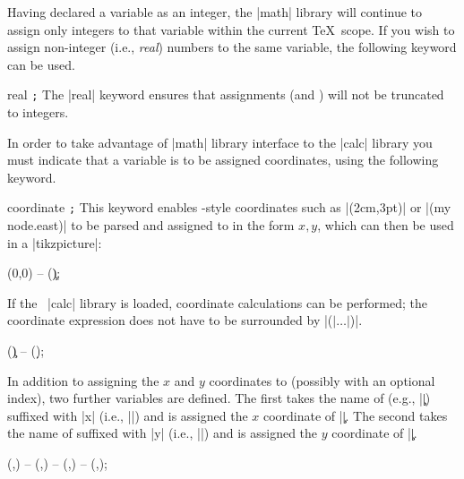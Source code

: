Having declared a variable as an integer, the |math| library will continue to
assign only integers to that variable within the current \TeX\ scope. If you
wish to assign non-integer (i.e., \emph{real}) numbers to the same variable,
the following keyword can be used.

\begin{math-keyword}{{real} \texttt{;}}
    The |real| keyword ensures that assignments  (and
    ) will not be truncated to integers.
\end{math-keyword}

In order to take advantage of |math| library interface to the |calc| library
you must indicate that a variable is to be assigned coordinates, using the
following keyword.

\begin{math-keyword}{{coordinate} \texttt{;}}
    This keyword enables \tikzname-style coordinates such as |(2cm,3pt)| or
    |(my node.east)| to be parsed and assigned to  in the form
    $x,y$, which can then be used in a |tikzpicture|:
\begin{codeexample}[preamble={\usetikzlibrary{math}}]
\tikz\draw (0,0) -- (\c);
\end{codeexample}

    If the \tikzname\ |calc| library is loaded, coordinate calculations can be
    performed; the coordinate expression does not have to be surrounded by
    |($|\ldots|$)|.
\begin{codeexample}[preamble={\usetikzlibrary{math,calc}}]
\tikz\draw (\c) -- (\d);
\end{codeexample}

    In addition to assigning the $x$ and $y$ coordinates to 
    (possibly with an optional index), two further variables are defined. The
    first takes the name of  (e.g., |\c|) suffixed with |x|
    (i.e., |\cx|) and is assigned the $x$ coordinate of |\c|. The second takes
    the name of  suffixed with |y| (i.e., |\cy|) and is assigned
    the $y$ coordinate of |\c|.
\begin{codeexample}[preamble={\usetikzlibrary{math}}]
\tikz\draw (,) -- (,) -- (,) -- (,);
\end{codeexample}
\end{math-keyword}

